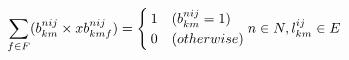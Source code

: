 \documentclass[a4j,twocolumn,fleqn]{jarticle}
\begin{document}
\begin{equation}%
\sum_{f \in F} (b^{nij}_{km} \times xb^{nij}_{kmf})= 
\begin{cases}
1 & (b^{nij}_{km} = 1)\\*
0 & (otherwise)
\end{cases}
\\* n \in N, l^{ij}_{km} \in E \nonumber
\end{equation}
\end{document}
